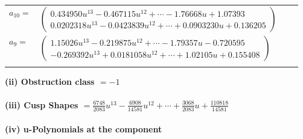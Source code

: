\documentclass[1p]{elsarticle_modified}
\theoremstyle{definition}
\begin{document}
\begin{tabular}{m{7pt} m{180pt} m{7pt} m{180pt} }
\flushright $a_{10}=$&$\begin{pmatrix}0.434950 u^{13}-0.467115 u^{12}+\cdots-1.76668 u+1.07393\\0.0202318 u^{13}-0.0423839 u^{12}+\cdots+0.0903230 u+0.136205\end{pmatrix}$ \\
\flushright $a_{9}=$&$\begin{pmatrix}1.15026 u^{13}-0.219875 u^{12}+\cdots-1.79357 u-0.720595\\-0.269392 u^{13}+0.0181058 u^{12}+\cdots+1.02105 u+0.155408\end{pmatrix}$\\&\end{tabular}
\flushleft \textbf{(ii) Obstruction class $= -1$}\\~\\
\flushleft \textbf{(iii) Cusp Shapes $= \frac{6748}{2083} u^{13}-\frac{6908}{14581} u^{12}+\cdots+\frac{3068}{2083} u+\frac{110818}{14581}$}\\~\\
\newpage\renewcommand{\arraystretch}{1}
\flushleft \textbf{(iv) u-Polynomials at the component}\newline \\
\end{document}
